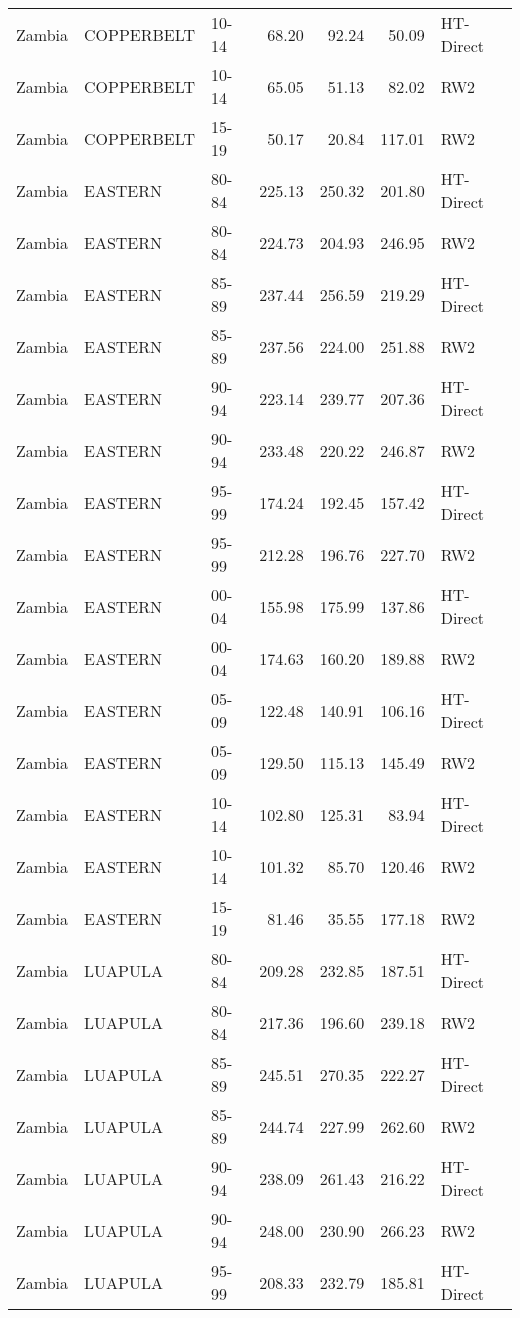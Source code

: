 \begin{longtable}{lllrrrl}
  Zambia & COPPERBELT & 10-14 & 68.20 & 92.24 & 50.09 & HT-Direct \\ 
  Zambia & COPPERBELT & 10-14 & 65.05 & 51.13 & 82.02 & RW2 \\ 
  Zambia & COPPERBELT & 15-19 & 50.17 & 20.84 & 117.01 & RW2 \\ 
  Zambia & EASTERN & 80-84 & 225.13 & 250.32 & 201.80 & HT-Direct \\ 
  Zambia & EASTERN & 80-84 & 224.73 & 204.93 & 246.95 & RW2 \\ 
  Zambia & EASTERN & 85-89 & 237.44 & 256.59 & 219.29 & HT-Direct \\ 
  Zambia & EASTERN & 85-89 & 237.56 & 224.00 & 251.88 & RW2 \\ 
  Zambia & EASTERN & 90-94 & 223.14 & 239.77 & 207.36 & HT-Direct \\ 
  Zambia & EASTERN & 90-94 & 233.48 & 220.22 & 246.87 & RW2 \\ 
  Zambia & EASTERN & 95-99 & 174.24 & 192.45 & 157.42 & HT-Direct \\ 
  Zambia & EASTERN & 95-99 & 212.28 & 196.76 & 227.70 & RW2 \\ 
  Zambia & EASTERN & 00-04 & 155.98 & 175.99 & 137.86 & HT-Direct \\ 
  Zambia & EASTERN & 00-04 & 174.63 & 160.20 & 189.88 & RW2 \\ 
  Zambia & EASTERN & 05-09 & 122.48 & 140.91 & 106.16 & HT-Direct \\ 
  Zambia & EASTERN & 05-09 & 129.50 & 115.13 & 145.49 & RW2 \\ 
  Zambia & EASTERN & 10-14 & 102.80 & 125.31 & 83.94 & HT-Direct \\ 
  Zambia & EASTERN & 10-14 & 101.32 & 85.70 & 120.46 & RW2 \\ 
  Zambia & EASTERN & 15-19 & 81.46 & 35.55 & 177.18 & RW2 \\ 
  Zambia & LUAPULA & 80-84 & 209.28 & 232.85 & 187.51 & HT-Direct \\ 
  Zambia & LUAPULA & 80-84 & 217.36 & 196.60 & 239.18 & RW2 \\ 
  Zambia & LUAPULA & 85-89 & 245.51 & 270.35 & 222.27 & HT-Direct \\ 
  Zambia & LUAPULA & 85-89 & 244.74 & 227.99 & 262.60 & RW2 \\ 
  Zambia & LUAPULA & 90-94 & 238.09 & 261.43 & 216.22 & HT-Direct \\ 
  Zambia & LUAPULA & 90-94 & 248.00 & 230.90 & 266.23 & RW2 \\ 
  Zambia & LUAPULA & 95-99 & 208.33 & 232.79 & 185.81 & HT-Direct \\ 

\end{longtable}
